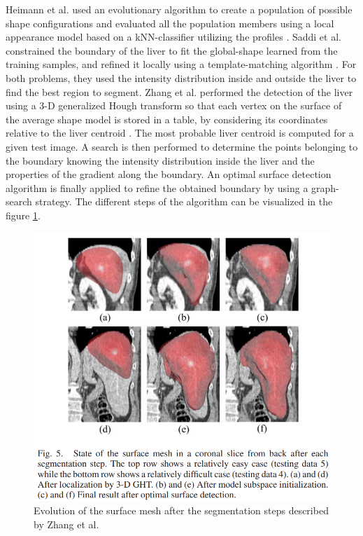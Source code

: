 \documentclass[]{article}
\begin{document}
	
	Heimann et al. used an evolutionary algorithm to create a population of
	possible shape configurations and evaluated all the population members
	using a local appearance model based on a kNN-classifier utilizing the
	profiles  \cite{Heimann2007}. 
	Saddi et al. constrained the boundary of the liver to fit the
	global-shape learned from the training samples, and refined it locally
	using a template-matching algorithm \cite{Saddi2007}. For both problems, they used the
	intensity distribution inside and outside the liver to find the best
	region to segment. Zhang et al. performed the detection of the liver using a 3-D
	generalized Hough transform so that each vertex on the surface of the
	average shape model is stored in a table, by considering its coordinates
	relative to the liver centroid \cite{Zhang2010}. The most probable liver centroid is
	computed for a given test image. A search is then performed to determine
	the points belonging to the boundary knowing the intensity distribution
	inside the liver and the properties of the gradient along the boundary.
	An optimal surface detection algorithm is finally applied to refine the
	obtained boundary by using a graph-search strategy. The different steps
	of the algorithm can be visualized in the figure \ref{Zhang2010_Fig5}.
	
	\begin{figure}[th!]
		\centering
		\includegraphics[width=0.5\linewidth]{images/image29}
		\caption{Evolution of the surface mesh after the segmentation steps described by Zhang et al. \cite{Zhang2010}}
		\label{Zhang2010_Fig5}
	\end{figure}
	
\end{document}
